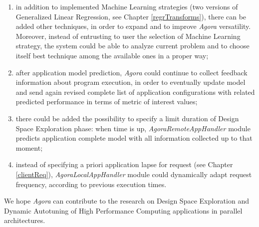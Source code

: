 \begin{enumerate}

	\item in addition to implemented Machine Learning strategies (two versions of Generalized Linear Regression, see Chapter \ref{regrTransforms}), there can be added other techniques, in order to expand and to improve \textit{Agora} versatility. Moreover, instead of entrusting to user the selection of Machine Learning strategy, the system could be able to analyze current problem and to choose itself best technique among the available ones in a proper way;

	\item after application model prediction, \textit{Agora} could continue to collect feedback information about program execution, in order to eventually update model and send again revised complete list of application configurations with related predicted performance in terms of metric of interest values;

	\item there could be added the possibility to specify a limit duration of Design Space Exploration phase: when time is up, \textit{AgoraRemoteAppHandler} module predicts application complete model with all information collected up to that moment;

	\item instead of specifying a priori application lapse for request (see Chapter \ref{clientReq}), \textit{AgoraLocalAppHandler} module could dynamically a\-dapt request frequency, according to previous execution times.

\end{enumerate}

We hope \textit{Agora} can contribute to the research on Design Space Exploration and Dynamic Autotuning of High Performance Computing applications in parallel architectures.
